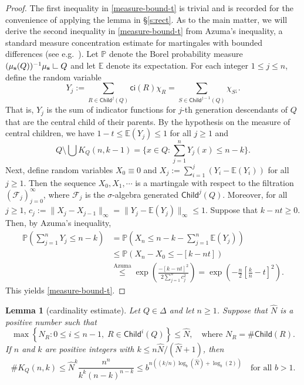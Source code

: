 \documentclass[12pt]{amsart}
\newtheorem{lemma}[theorem]{Lemma}
\theoremstyle{definition}
\theoremstyle{remark}
\newcommand{\res}{\hbox{ {\vrule height .22cm}{\leaders\hrule\hskip.2cm} }} %
\newcommand{\muse}{\mu_{\mathbf{s}}}
\newcommand{\Child}{\mathsf{Child}}
\numberwithin{figure}{section}
\numberwithin{equation}{section}
\begin{document}
\begin{proof} The first inequality in \eqref{measure-bound-t} is trivial and is recorded for the convenience of applying the lemma in \S\ref{s:rect}. As to the main matter, we will derive the second inequality in \eqref{measure-bound-t} from Azuma's inequality, a standard measure concentration estimate for martingales with bounded differences (see e.g.~\cite[top of p.~96]{concentration-survey}).
Let $\mathbb{P}$ denote the Borel probability measure $(\muse(Q))^{-1}\muse\res Q$ and let $\mathbb{E}$ denote its expectation. For each integer $1\leq j\leq n$, define the random variable \begin{equation*}Y_j:=\sum_{R\in\Child^{j}(Q)} \mathsf{ci}(R)\chi_R=\sum_{S\in\Child^{j-1}(Q)}\chi_{S^\downarrow}.\end{equation*} That is, $Y_j$ is the sum of indicator functions for $j$-th generation descendants of $Q$ that are the central child of their parents. By the hypothesis on the measure of central children, we have $1-t\leq \mathbb{E}(Y_j)\leq 1$ for all $j\geq 1$ and $$Q\setminus \textstyle\bigcup K_Q(n,k-1)=\{x\in Q:\sum_{j=1}^{n} Y_j(x)\leq n-k\}.$$ Next, define random variables $X_0\equiv 0$ and $X_j:=\sum_{i=1}^j \left(Y_i-\mathbb{E}(Y_i)\right)$ for all $j\geq 1$. Then the sequence $X_0,X_1,\cdots$ is a martingale with respect to the filtration $(\mathscr{F}_j)_{j=0}^\infty$, where $\mathscr{F}_j$ is the $\sigma$-algebra generated $\Child^j(Q)$. Moreover, for all $j\geq 1$, $c_j:=\|X_{j}-X_{j-1}\|_\infty = \|Y_{j}-\mathbb{E}(Y_{j})\|_\infty\leq 1$. Suppose that $k-nt\geq 0$. Then, by Azuma's inequality, \begin{equation*}\begin{split}
\mathbb{P}\left(\textstyle\sum_{j=1}^{n} Y_j\leq n-k\right)&=\mathbb{P}\left(X_{n}\leq n-k-\textstyle\sum_{j=1}^{n}\mathbb{E}(Y_j)\right)\\
&\leq \mathbb{P}\left(X_{n}-X_0\leq -\left[k-nt\right]\right)\\
&\stackrel{\textrm{Azuma}}{\leq} \exp\left( \frac{-\left[k-nt\right]^2}{2\sum_{j=1}^{n}c_j^2}\right)=\exp\left(-\frac{n}{2}\left[\frac{k}{n}-t\right]^2 \right).\end{split}\end{equation*} This yields \eqref{measure-bound-t}.
\end{proof}

\begin{lemma}[cardinality estimate] \label{l:KQ-bound} Let $Q\in\Delta$ and let $n\geq 1$. Suppose that $\hat N$ is a positive number such that \begin{equation}\label{hatN-requirement}\max\left\{N_R:0\leq i\leq n-1,\;R\in\Child^{i}(Q)\right\}\leq \hat N,\quad\text{where }N_R=\#\Child(R).\end{equation}
If $n$ and $k$ are positive integers with $k\leq n\hat N/(\hat N + 1)$, then \begin{equation}\label{KQ-bound}\#K_Q(n,k) \leq \hat N^k\frac{n^n}{k^k(n-k)^{n-k}}\leq b^{n\left((k/n)\log_b(\hat N)+\log_b(2)\right)}\quad\text{for all $b>1$}.\end{equation} \end{lemma}
\end{document}
